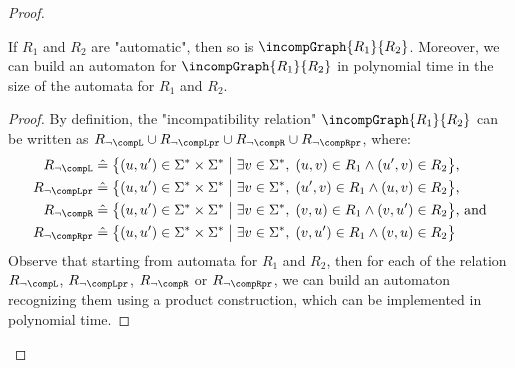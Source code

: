 \begin{proof}
\begin{lemma}
    \AP\label{lem:incomp-is-automatic}
    If $R_1$ and $R_2$ are "automatic", then so is $\incompGraph{R_1}{R_2}$.
    Moreover, we can build an automaton for $\incompGraph{R_1}{R_2}$ in polynomial time in the size of the automata for $R_1$ and $R_2$.
\end{lemma}
\begin{proof}
    By definition, the "incompatibility relation" $\incompGraph{R_1}{R_2}$ can be written as
	$R_{\neg\compL} \cup R_{\neg\compLpr} \cup R_{\neg\compR} \cup R_{\neg\compRpr}$, where:
	\begin{align*}
        R_{\neg\compL} &\defeq \big\{ (u,u') \in \Sigma^* \times \Sigma^* \;\big\vert\; \exists v \in \Sigma^*,\; (u,v) \in R_1 \land (u',v) \in R_2 \big\} \text{,}\\
        R_{\neg\compLpr} &\defeq \big\{ (u,u') \in \Sigma^* \times \Sigma^* \;\big\vert\; \exists v \in \Sigma^*,\; (u',v) \in R_1 \land (u,v) \in R_2 \big\} \text{,}\\
        R_{\neg\compR} &\defeq \big\{ (u,u') \in \Sigma^* \times \Sigma^* \;\big\vert\; \exists v \in \Sigma^*,\; (v,u) \in R_1 \land (v,u') \in R_2 \big\} \text{, and}\\
        R_{\neg\compRpr} &\defeq \big\{ (u,u') \in \Sigma^* \times \Sigma^* \;\big\vert\; \exists v \in \Sigma^*,\; (v,u') \in R_1 \land (v,u) \in R_2 \big\}
    \end{align*}
    Observe that starting from automata for $R_1$ and $R_2$, then for each
	of the relation $R_{\neg\compL}$, $R_{\neg\compLpr}$, $R_{\neg\compR}$ or $R_{\neg\compRpr}$, we can build an automaton recognizing them
	using a product construction, which can be implemented in polynomial time.

\end{proof}
\end{proof}
